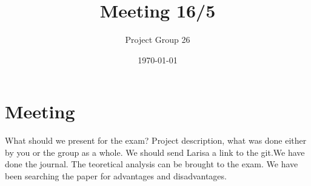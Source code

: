 \documentclass{article}
\title{Meeting 16/5}
\author{Project Group 26}
\date{\today}
\begin{document}
\maketitle

\section{Meeting}

What should we present for the exam? Project description, what was done either by you or the group as a whole. We should send Larisa a link to the git.We have done the journal. The teoretical analysis can be brought to the exam. We have been searching the paper for advantages and disadvantages.
\end{document}
